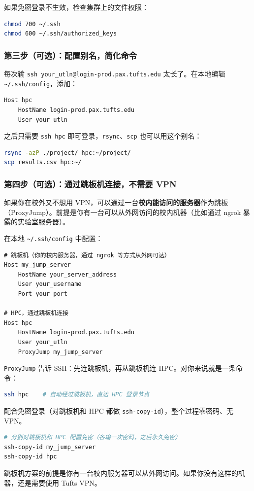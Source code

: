 \begin{tipbox}
如果免密登录不生效，检查集群上的文件权限：
\begin{lstlisting}[language=bash]
chmod 700 ~/.ssh
chmod 600 ~/.ssh/authorized_keys
\end{lstlisting}
\end{tipbox}

\subsubsection{第三步（可选）：配置别名，简化命令}

每次输 \texttt{ssh your\_utln@login-prod.pax.tufts.edu} 太长了。在本地编辑 \texttt{\textasciitilde/.ssh/config}，添加：

\begin{lstlisting}
Host hpc
    HostName login-prod.pax.tufts.edu
    User your_utln
\end{lstlisting}

之后只需要 \texttt{ssh hpc} 即可登录，\texttt{rsync}、\texttt{scp} 也可以用这个别名：

\begin{lstlisting}[language=bash]
rsync -azP ./project/ hpc:~/project/
scp results.csv hpc:~/
\end{lstlisting}

\subsubsection{第四步（可选）：通过跳板机连接，不需要 VPN}

如果你在校外又不想用 VPN，可以通过一台\textbf{校内能访问的服务器}作为跳板（ProxyJump）。前提是你有一台可以从外网访问的校内机器（比如通过 ngrok 暴露的实验室服务器）。

在本地 \texttt{\textasciitilde/.ssh/config} 中配置：

\begin{lstlisting}
# 跳板机（你的校内服务器，通过 ngrok 等方式从外网可达）
Host my_jump_server
    HostName your_server_address
    User your_username
    Port your_port

# HPC，通过跳板机连接
Host hpc
    HostName login-prod.pax.tufts.edu
    User your_utln
    ProxyJump my_jump_server
\end{lstlisting}

\texttt{ProxyJump} 告诉 SSH：先连跳板机，再从跳板机连 HPC。对你来说就是一条命令：

\begin{lstlisting}[language=bash]
ssh hpc    # 自动经过跳板机，直达 HPC 登录节点
\end{lstlisting}

配合免密登录（对跳板机和 HPC 都做 \texttt{ssh-copy-id}），整个过程零密码、无 VPN。

\begin{lstlisting}[language=bash]
# 分别对跳板机和 HPC 配置免密（各输一次密码，之后永久免密）
ssh-copy-id my_jump_server
ssh-copy-id hpc
\end{lstlisting}

\begin{warnbox}
跳板机方案的前提是你有一台校内服务器可以从外网访问。如果你没有这样的机器，还是需要使用 Tufts VPN。
\end{warnbox}
